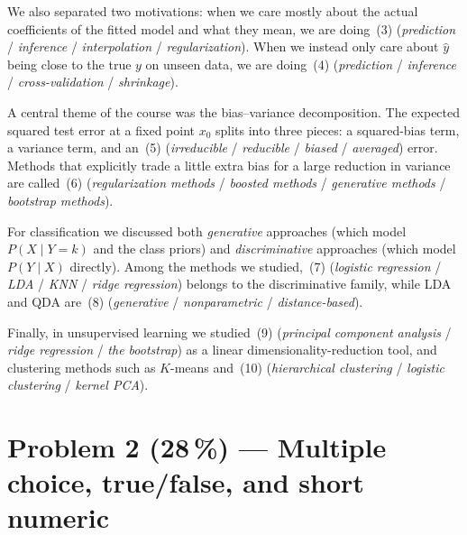 \documentclass[11pt,a4paper]{article}
\newcommand{\points}[1]{\textbf{(#1\,\%)}}
\begin{document}
We also separated two motivations: when we care mostly about the actual coefficients of the fitted model and what they mean, we are doing \underline{\hspace{2cm}}\,(3) (\emph{prediction} / \emph{inference} / \emph{interpolation} / \emph{regularization}). When we instead only care about $\hat y$ being close to the true $y$ on unseen data, we are doing \underline{\hspace{2cm}}\,(4) (\emph{prediction} / \emph{inference} / \emph{cross-validation} / \emph{shrinkage}).

A central theme of the course was the bias--variance decomposition. The expected squared test error at a fixed point $x_0$ splits into three pieces: a squared-bias term, a variance term, and an \underline{\hspace{2cm}}\,(5) (\emph{irreducible} / \emph{reducible} / \emph{biased} / \emph{averaged}) error. Methods that explicitly trade a little extra bias for a large reduction in variance are called \underline{\hspace{2cm}}\,(6) (\emph{regularization methods} / \emph{boosted methods} / \emph{generative methods} / \emph{bootstrap methods}).

For classification we discussed both \emph{generative} approaches (which model $P(X \mid Y\!=\!k)$ and the class priors) and \emph{discriminative} approaches (which model $P(Y \mid X)$ directly). Among the methods we studied, \underline{\hspace{2cm}}\,(7) (\emph{logistic regression} / \emph{LDA} / \emph{KNN} / \emph{ridge regression}) belongs to the discriminative family, while LDA and QDA are \underline{\hspace{2cm}}\,(8) (\emph{generative} / \emph{nonparametric} / \emph{distance-based}).

Finally, in unsupervised learning we studied \underline{\hspace{2cm}}\,(9) (\emph{principal component analysis} / \emph{ridge regression} / \emph{the bootstrap}) as a linear dimensionality-reduction tool, and clustering methods such as $K$-means and \underline{\hspace{2cm}}\,(10) (\emph{hierarchical clustering} / \emph{logistic clustering} / \emph{kernel PCA}).

\vfill\eject

\section*{Problem 2 \points{28} --- Multiple choice, true/false, and short numeric}
\end{document}
